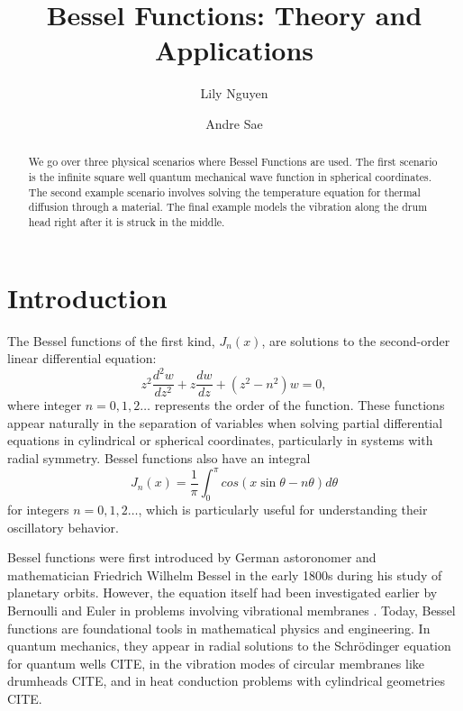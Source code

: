 \documentclass[linenumbers, RNAAS, trackchanges]{aastex631}
\begin{document}
\title{Bessel Functions: Theory and Applications}
\author{Lily Nguyen}

\author{Andre Sae}


\begin{abstract}

We go over three physical scenarios where Bessel Functions are used. The first 
scenario is the infinite square well quantum mechanical wave function in 
spherical coordinates. The second example scenario involves solving the 
temperature equation for thermal diffusion through a material. The final 
example models the vibration along the drum head right after it is struck in 
the middle. 

\end{abstract}



\section{Introduction} \label{sec:intro}

The Bessel functions of the first kind, $J_n(x)$, are solutions to the
second-order linear differential equation:
\begin{equation}
    z^2\frac{d^2 w}{dz^2}+z\frac{dw}{dz}+(z^2-n^2)w=0,
\end{equation}
\noindent where integer $n=0,1,2\dots$ represents the order of the
function. These functions appear naturally in the separation of variables when solving
partial differential equations in cylindrical or spherical coordinates,
particularly in systems with radial symmetry. Bessel functions also have an
integral
\begin{equation}
    J_n(x)=\frac{1}{\pi}\int_0^\pi cos(x\sin\theta-n\theta)d\theta
\end{equation}
\noindent for integers $n=0,1,2\dots$, which is particularly useful for understanding 
their oscillatory behavior.

\noindent Bessel functions were first introduced by German astoronomer and
mathematician Friedrich Wilhelm Bessel in the early 1800s during his study of
planetary orbits. However, the equation itself had been investigated earlier
by Bernoulli and Euler in problems involving vibrational membranes
\citet{abramowitz_stegun}. Today, Bessel functions are foundational tools in 
mathematical physics and engineering. In quantum mechanics, they appear in 
radial solutions to the Schrödinger equation for quantum wells CITE, in the 
vibration modes of circular membranes like drumheads CITE, and in heat 
conduction problems with cylindrical geometries CITE.
\end{document}
